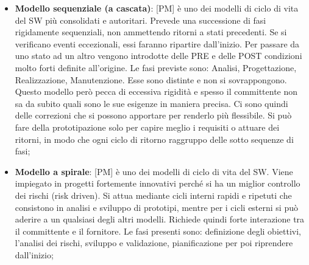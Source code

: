 \begin{itemize}
	\item \textbf{Modello sequenziale (a cascata)}: [PM] è uno dei modelli di ciclo di vita del SW più consolidati e autoritari. Prevede una successione di fasi rigidamente sequenziali, non ammettendo ritorni a stati precedenti. Se si verificano eventi eccezionali, essi faranno ripartire dall'inizio. \newline
Per passare da uno stato ad un altro vengono introdotte delle PRE e delle POST condizioni molto forti definite all'origine. Le fasi previste sono: Analisi, Progettazione, Realizzazione, Manutenzione. Esse sono distinte e non si sovrappongono. \newline
Questo modello però pecca di eccessiva rigidità e spesso il committente non sa da subito quali sono le sue esigenze in maniera precisa.\newline
Ci sono quindi delle correzioni che si possono apportare per renderlo più flessibile. Si può fare della prototipazione solo per capire meglio i requisiti o attuare dei ritorni, in modo che ogni ciclo di ritorno raggruppo delle sotto sequenze di fasi;

	\item \textbf{Modello a spirale}: [PM] è uno dei modelli di ciclo di vita del SW. Viene impiegato in progetti fortemente innovativi perché si ha un miglior controllo dei rischi (risk driven). \newline
Si attua mediante cicli interni rapidi e ripetuti che consistono in analisi e sviluppo di prototipi, mentre per i cicli esterni si può aderire a un qualsiasi degli altri modelli. \newline
Richiede quindi forte interazione tra il committente e il fornitore. Le fasi presenti sono: definizione degli obiettivi, l'analisi dei rischi, sviluppo e validazione, pianificazione per poi riprendere dall'inizio;

\end{itemize}